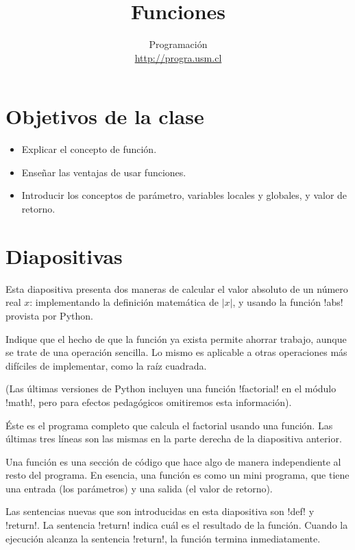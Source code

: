 \documentclass[10pt]{article}
\title{Funciones}
\author{Programación \\ \url{http://progra.usm.cl}}
\date{}
\begin{document}
  \maketitle

  \section*{Objetivos de la clase}
  \begin{itemize}
    \item Explicar el concepto de función.
    \item Enseñar las ventajas de usar funciones.
    \item Introducir los conceptos de parámetro, variables locales y globales,
      y valor de retorno.
  \end{itemize}

  \section*{Diapositivas}


  Esta diapositiva presenta dos maneras de calcular
  el valor absoluto de un número real \(x\):
  implementando la definición matemática de \(\lvert x\rvert\),
  y usando la función \li!abs! provista por Python.

  Indique que el hecho de que la función ya exista
  permite ahorrar trabajo, aunque se trate de una operación sencilla.
  Lo mismo es aplicable a otras operaciones más difíciles de implementar,
  como la raíz cuadrada.


  

  (Las últimas versiones de Python incluyen una función \li!factorial!
  en el módulo \li!math!,
  pero para efectos pedagógicos
  omitiremos esta información).


  Éste es el programa completo
  que calcula el factorial
  usando una función.
  Las últimas tres líneas son las mismas
  en la parte derecha de la diapositiva anterior.

  Una función es una sección de código que hace algo
  de manera independiente al resto del programa.
  En esencia,
  una función es como un mini programa,
  que tiene una entrada (los parámetros)
  y una salida (el valor de retorno).

  Las sentencias nuevas que son introducidas en esta diapositiva
  son \li!def! y \li!return!.
  La sentencia \li!return! indica cuál es el resultado de la función.
  Cuando la ejecución alcanza la sentencia \li!return!,
  la función termina inmediatamente.
\end{document}
